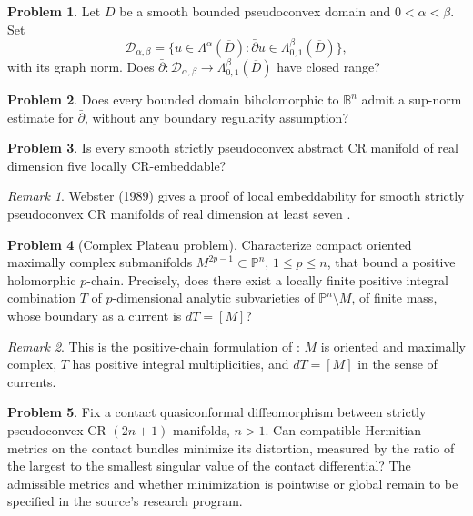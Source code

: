 \documentclass[11pt,reqno]{amsart}
\theoremstyle{definition}
\newtheorem{problem}{Problem}[section]
\theoremstyle{remark}
\newtheorem*{remark}{Remark}
\begin{document}
\begin{problem}\label{b95-6-4-3}
Let $D$ be a smooth bounded pseudoconvex domain and $0<\alpha<\beta$. Set
\[
 \mathcal D_{\alpha,\beta}
 =\{u\in\Lambda^\alpha(\overline D):
       \bar\partial u\in\Lambda^\beta_{0,1}(\overline D)\},
\]
with its graph norm. Does
$\bar\partial:\mathcal D_{\alpha,\beta}\to\Lambda^\beta_{0,1}(\overline D)$ have closed range?
\end{problem}


\begin{problem}\label{b95-6-4-4}
Does every bounded domain biholomorphic to $\mathbb B^n$ admit a sup-norm estimate for $\bar\partial$, without any boundary regularity assumption?
\end{problem}


\begin{problem}\label{b95-12-1-1}
Is every smooth strictly pseudoconvex abstract CR manifold of real dimension five locally CR-embeddable?
\end{problem}
\begin{remark}
Webster (1989) gives a proof of local embeddability for smooth strictly pseudoconvex CR manifolds of real dimension at least seven \cite{B95-Webster}.
\end{remark}

\begin{problem}[Complex Plateau problem]\label{b95-12-2-1}
Characterize compact oriented maximally complex submanifolds $M^{2p-1}\subset\mathbb P^n$, $1\leq p\leq n$, that bound a positive holomorphic $p$-chain. Precisely, does there exist a locally finite positive integral combination $T$ of $p$-dimensional analytic subvarieties of $\mathbb P^n\setminus M$, of finite mass, whose boundary as a current is $dT=[M]$?
\end{problem}
\begin{remark}
This is the positive-chain formulation of \cite[Problem~12.2.1]{B95}: $M$ is oriented and maximally complex, $T$ has positive integral multiplicities, and $dT=[M]$ in the sense of currents.
\end{remark}


\begin{problem}\label{b95-12-3-2}
Fix a contact quasiconformal diffeomorphism between strictly pseudoconvex CR $(2n+1)$-manifolds, $n>1$. Can compatible Hermitian metrics on the contact bundles minimize its distortion, measured by the ratio of the largest to the smallest singular value of the contact differential? The admissible metrics and whether minimization is pointwise or global remain to be specified in the source's research program.
\end{problem}
\end{document}
